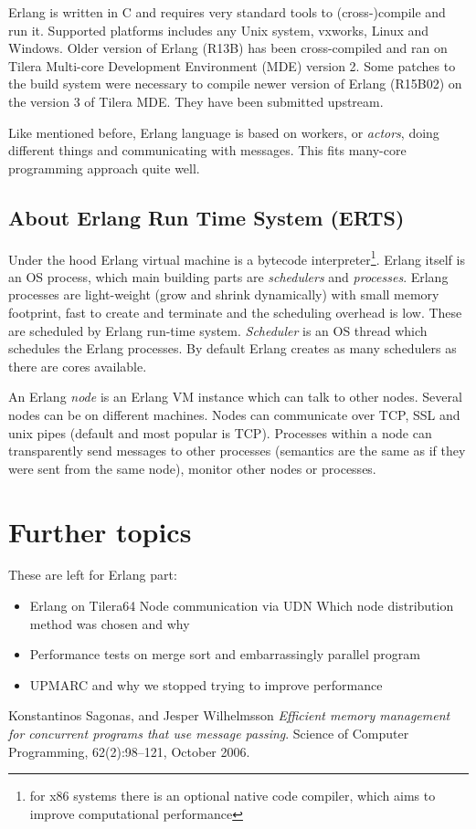 \documentclass[english,11pt]{article}
\begin{document}
Erlang is written in C and requires very standard tools to (cross-)compile and
run it. Supported platforms includes any Unix system, vxworks, Linux and
Windows. Older version of Erlang (R13B) has been cross-compiled and ran on
Tilera Multi-core Development Environment (MDE) version 2. Some patches to the
build system were necessary to compile newer version of Erlang (R15B02) on the
version 3 of Tilera MDE. They have been submitted upstream.

Like mentioned before, Erlang language is based on workers, or {\em actors},
doing different things and communicating with messages. This fits many-core
programming approach quite well.

\subsection{About Erlang Run Time System (ERTS)}

Under the hood Erlang virtual machine is a bytecode interpreter\footnote{for
x86 systems there is an optional native code compiler, which aims to improve
computational performance\cite{hipe}}. Erlang itself is an OS process, which
main building parts are {\em schedulers} and {\em processes}. Erlang processes
are light-weight (grow and shrink dynamically) with small memory footprint,
fast to create and terminate and the scheduling overhead is low. These are
scheduled by Erlang run-time system. {\em Scheduler} is an OS thread which
schedules the Erlang processes. By default Erlang creates as many schedulers as
there are cores available.

An Erlang {\em node} is an Erlang VM instance which can talk to other nodes.
Several nodes can be on different machines. Nodes can communicate over TCP, SSL
and unix pipes (default and most popular is TCP). Processes within a node can
transparently send messages to other processes (semantics are the same as if
they were sent from the same node), monitor other nodes or processes.

\section{Further topics}

These are left for Erlang part:
\begin{itemize}
    \item Erlang on Tilera64
        \subitem Node communication via UDN
        \subitem Which node distribution method was chosen and why
    \item Performance tests on merge sort and embarrassingly parallel program
    \item UPMARC and why we stopped trying to improve performance
\end{itemize}


\clearpage
\begin{thebibliography}{9}

     Konstantinos Sagonas, and Jesper Wilhelmsson \emph{Efficient
    memory management for concurrent programs that use message passing}.
    Science of Computer Programming, 62(2):98--121, October 2006.

\end{thebibliography}
\end{document}
